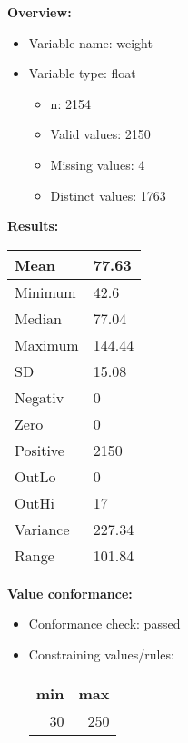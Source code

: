 \documentclass[
]{article}
\providecommand{\tightlist}{%
  \setlength{\itemsep}{0pt}\setlength{\parskip}{0pt}}
\begin{document}
\textbf{Overview:}

\begin{itemize}
\tightlist
\item
  Variable name: weight
\item
  Variable type: float

  \begin{itemize}
  \tightlist
  \item
    n: 2154
  \item
    Valid values: 2150
  \item
    Missing values: 4
  \item
    Distinct values: 1763
  \end{itemize}
\end{itemize}

\textbf{Results:}\\

\begin{table}[H]
\centering
\begin{tabular}{l|l}
\hline
Mean & 77.63\\
\hline
Minimum & 42.6\\
\hline
Median & 77.04\\
\hline
Maximum & 144.44\\
\hline
SD & 15.08\\
\hline
Negativ & 0\\
\hline
Zero & 0\\
\hline
Positive & 2150\\
\hline
OutLo & 0\\
\hline
OutHi & 17\\
\hline
Variance & 227.34\\
\hline
Range & 101.84\\
\hline
\end{tabular}
\end{table}

\textbf{Value conformance:}

\begin{itemize}
\tightlist
\item
  Conformance check: passed
\item
  Constraining values/rules:

  \begin{table}[H]
  \centering
  \begin{tabular}{r|r}
  \hline
  \textbf{min} & \textbf{max}\\
  \hline
  30 & 250\\
  \hline
  \end{tabular}
  \end{table}
\end{itemize}
\end{document}
